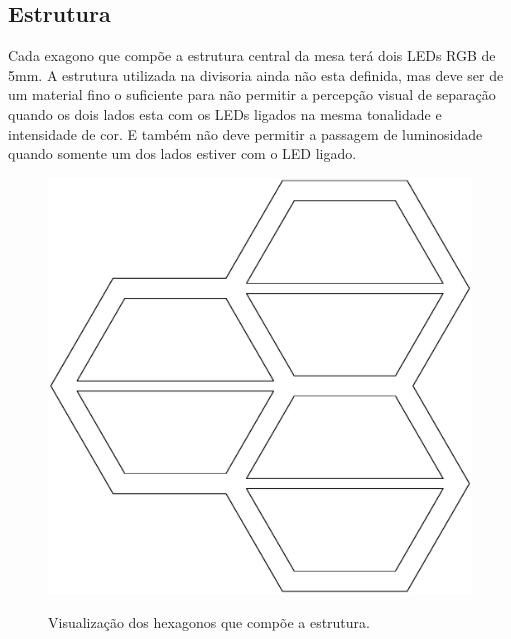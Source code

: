 \documentclass[a4paper,10pt]{article}
\begin{document}
\subsection{Estrutura}

Cada exagono que compõe a estrutura central da mesa terá dois LEDs RGB de 5mm. A estrutura utilizada na divisoria ainda não esta definida, mas deve ser de um material fino o suficiente para não permitir a percepção visual de separação quando os dois lados esta com os LEDs ligados na mesma tonalidade e intensidade de cor. E também não deve permitir a passagem de luminosidade quando somente um dos lados estiver com o LED ligado.

\begin{center}
\begin{figure}[h!]
	\center
	\includegraphics[angle=0, scale=0.25]{./img/prototipo-projeto-mesa-v02-b.ps}
	\label{figura_prototipo}
	\caption{Visualização dos hexagonos que compõe a estrutura.}
\end{figure}
\end{center}
\end{document}
